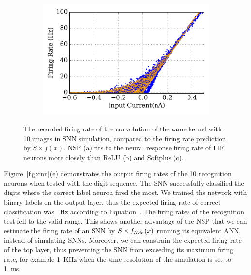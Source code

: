 \begin{figure}[tbh!]
\begin{subfigure}[t]{0.6\textwidth}
			\DIFdelbeginFL %
\DIFdelendFL \DIFaddbeginFL \includegraphics[width=\textwidth]{pics_iconip/revise_6-5-3.pdf}
			\caption{}
		\DIFaddendFL \end{subfigure}
		\caption[The recorded firing rate of the convolution outcomes.]{
			The recorded firing rate of the convolution of the same kernel with 10 images in SNN simulation, compared to the firing rate prediction by $S \times f(x)$.
			NSP (a) fits to the neural response firing rate of LIF neurons more closely than ReLU (b) and Softplus (c).}
		\label{fig:af_compare}
	\end{figure}

	Figure~\ref{fig:cnn}(e) demonstrates the output firing rates of the 10 recognition neurons when tested with the digit sequence.
	The SNN successfully classified the digits where the correct label neuron fired the most.
	We trained the network with binary labels on the output layer, thus the expected firing rate of correct classification was \DIFdelbegin {}\DIFdelend \DIFaddbegin {}\DIFaddend ~Hz according to Equation~\DIFdelbegin \DIFdel{\ref{Fig:tneuron}}\DIFdelend \DIFaddbegin \DIFadd{\ref{equ:nsp_input}}\DIFaddend .
	The firing rates of the recognition test fell to the valid range\DIFdelbegin {}\DIFdelend .
	This shows another advantage of the NSP that we can estimate the firing rate of an SNN by $S \times f_{\textit{\textrm{NSP}}}(x)$ running its equivalent ANN, instead of simulating SNNs.
	Moreover, we can constrain the expected firing rate of the top layer, thus preventing the SNN from exceeding its maximum firing rate, for example 1~KHz when the time resolution of the simulation is set to 1~ms.

